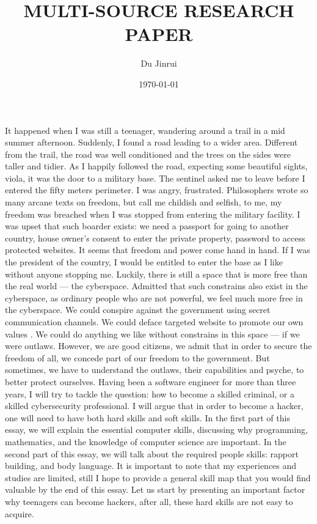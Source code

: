 \documentclass{article}
\title{MULTI-SOURCE RESEARCH PAPER}
\author{Du Jinrui}
\date{\today}
\begin{document}
\maketitle

It happened when I was still a teenager, wandering around a trail in a mid summer afternoon. Suddenly, I found a road leading to a wider area. Different from the trail, the road was well conditioned and the trees on the sides were taller and tidier. As I happily followed the road, expecting some beautiful sights, viola, it was the door to a military base. The sentinel asked me to leave before I entered the fifty meters perimeter. I was angry, frustrated. Philosophers wrote so many arcane texts on freedom, but call me childish and selfish, to me, my freedom was breached when I was stopped from entering the military facility. I was upset that such boarder exists: we need a passport for going to another country, house owner's consent to enter the private property, password to access protected websites. It seems that freedom and power come hand in hand. If I was the president of the country, I would be entitled to enter the base as I like without anyone stopping me. Luckily, there is still a space that is more free than the real world --- the cyberspace. Admitted that such constrains also exist in the cyberspace, as ordinary people who are not powerful, we feel much more free in the cyberspace. We could conspire against the government using secret communication channels. We could deface targeted website to promote our own values \cite[p.~21]{Holt2017}. We could do anything we like without constrains in this space --- if we were outlaws. However, we are good citizens, we admit that in order to secure the freedom of all, we concede part of our freedom to the government. But sometimes, we have to understand the outlaws, their capabilities and psyche, to better protect ourselves. Having been a software engineer for more than three years, I will try to tackle the question: how to become a skilled criminal, or a skilled cybersecurity professional. I will argue that in order to become a hacker, one will need to have both hard skills and soft skills. In the first part of this essay, we will explain the essential computer skills, discussing why programming, mathematics, and the knowledge of computer science are important. In the second part of this essay, we will talk about the required people skills: rapport building, and body language. It is important to note that my experiences and studies are limited, still I hope to provide a general skill map that you would find valuable by the end of this essay. Let us start by presenting an important factor why teenagers can become hackers, after all, these hard skills are not easy to acquire.
\end{document}
